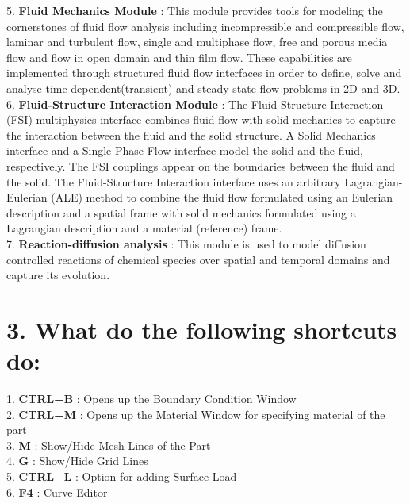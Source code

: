 \documentclass[a4paper,oneside,11pt]{report}
\begin{document}
5. \textbf{Fluid Mechanics Module} : This module provides tools for modeling the cornerstones of fluid flow analysis including incompressible and compressible flow, laminar and turbulent flow, single and multiphase flow, free and porous media flow and flow in open domain and thin film flow. These capabilities are implemented through structured fluid flow interfaces in order to define, solve and analyse time dependent(transient) and steady-state flow problems in 2D and 3D. \\
6. \textbf{Fluid-Structure Interaction Module} : The Fluid-Structure Interaction (FSI) multiphysics interface combines fluid flow with solid mechanics to capture the interaction between the fluid and the solid structure. A Solid Mechanics interface and a Single-Phase Flow interface model the solid and the fluid, respectively. The FSI couplings appear on the boundaries between the fluid and the solid. The Fluid-Structure Interaction interface uses an arbitrary Lagrangian-Eulerian (ALE) method to combine the fluid flow formulated using an Eulerian description and a spatial frame with solid mechanics formulated using a Lagrangian description and a material (reference) frame. \\
7. \textbf{Reaction-diffusion analysis} : This module is used to model diffusion controlled reactions of chemical species over spatial and temporal domains and capture its evolution. 
\section*{3. What do the following shortcuts do:}
1. \textbf{CTRL+B} : Opens up the Boundary Condition Window\\
2. \textbf{CTRL+M} : Opens up the Material Window for specifying material of the part\\
3. \textbf{M} : Show/Hide Mesh Lines of the Part\\
4. \textbf{G} : Show/Hide Grid Lines \\
5. \textbf{CTRL+L} : Option for adding Surface Load \\
6. \textbf{F4} : Curve Editor \\
\end{document}

